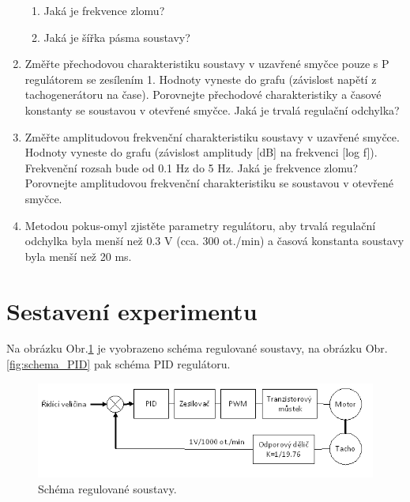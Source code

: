 \begin{enumerate}
\begin{enumerate}
	\item Jaká je frekvence zlomu?
	\item Jaká je šířka pásma soustavy?
\end{enumerate}
\item Změřte přechodovou charakteristiku soustavy v uzavřené smyčce pouze s P regulátorem se zesílením 1. Hodnoty vyneste do grafu (závislost napětí z tachogenerátoru na čase). Porovnejte přechodové charakteristiky a časové konstanty se soustavou v otevřené smyčce. Jaká je trvalá regulační odchylka?
\item Změřte amplitudovou frekvenční charakteristiku soustavy v uzavřené smyčce. Hodnoty vyneste do grafu (závislost amplitudy [dB] na frekvenci [log f]). Frekvenční rozsah bude od 0.1 Hz do 5 Hz. Jaká je frekvence zlomu? Porovnejte amplitudovou frekvenční charakteristiku se soustavou v otevřené smyčce.
\item Metodou pokus-omyl zjistěte parametry regulátoru, aby trvalá regulační odchylka byla menší než 0.3 V (cca. 300 ot./min) a časová konstanta soustavy byla menší než 20 ms.
\end{enumerate}



\section{Sestavení experimentu}
Na obrázku Obr.\ref{fig:schema_reg} je vyobrazeno schéma regulované soustavy, na obrázku Obr.\ref{fig:schema_PID} pak schéma PID regulátoru.


\begin{figure}[!hbt] %
	\centering
	\includegraphics[]{img/schema_regulovane_soustavy.png} %
	\caption{Schéma regulované soustavy.} %
	\label{fig:schema_reg} %
	\end{figure}	

